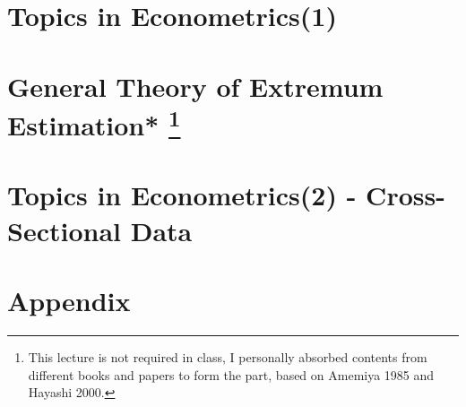 \documentclass[a4paper]{report}
\begin{document}
\chapter{Topics in Econometrics(1)}

\chapter{General Theory of Extremum Estimation* \protect\footnote{This lecture is not required in class, I personally absorbed contents from different books and papers to form the part, based on Amemiya 1985\cite{amemiya1985advanced} and Hayashi 2000\cite{hayashi2000econometrics}.}}

\chapter{Topics in Econometrics(2) - Cross-Sectional Data}



\chapter*{Appendix}

\nocite{*} %


\end{document}
